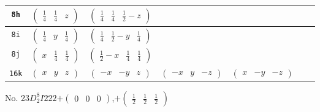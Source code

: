 \documentclass[fleqn,9pt,landscape]{jsarticle}
\begin{document}
\begin{center}
\begin{longtable}{ccccccc}
{\tt 8h} & $ \begin{pmatrix} \frac{1}{4} & \frac{1}{4} & z \end{pmatrix} $ & $ \begin{pmatrix} \frac{1}{4} & \frac{1}{4} & \frac{1}{2} - z \end{pmatrix} $ & $  $ & $  $ \\ \hline
{\tt 8i} & $ \begin{pmatrix} \frac{1}{4} & y & \frac{1}{4} \end{pmatrix} $ & $ \begin{pmatrix} \frac{1}{4} & \frac{1}{2} - y & \frac{1}{4} \end{pmatrix} $ & $  $ & $  $ \\ \hline
{\tt 8j} & $ \begin{pmatrix} x & \frac{1}{4} & \frac{1}{4} \end{pmatrix} $ & $ \begin{pmatrix} \frac{1}{2} - x & \frac{1}{4} & \frac{1}{4} \end{pmatrix} $ & $  $ & $  $ \\ \hline
{\tt 16k} & $ \begin{pmatrix} x & y & z \end{pmatrix} $ & $ \begin{pmatrix} - x & - y & z \end{pmatrix} $ & $ \begin{pmatrix} - x & y & - z \end{pmatrix} $ & $ \begin{pmatrix} x & - y & - z \end{pmatrix} $ \\
\end{longtable}
\end{center}
\newpage
No. 23\quad$D_{2}^{8}$\quad$I222$\quad[ orthorhombic ]\quad$+\begin{pmatrix} 0 & 0 & 0 \end{pmatrix}$,\quad $+\begin{pmatrix} \frac{1}{2} & \frac{1}{2} & \frac{1}{2} \end{pmatrix}$
\end{document}
